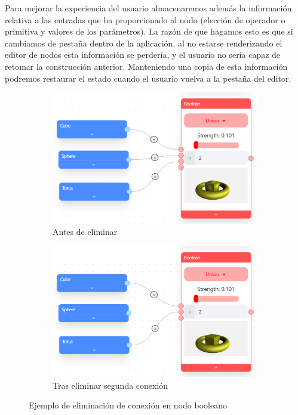 Para mejorar la experiencia del usuario almacenaremos además la información relativa a las entradas que ha proporcionado al nodo (elección de operador o primitiva y valores de los parámetros). La razón de que hagamos esto es que si cambiamos de pestaña dentro de la aplicación, al no estarse renderizando el editor de nodos esta información se perdería, y el usuario no sería capaz de retomar la construcción anterior. Manteniendo una copia de esta información podremos restaurar el estado cuando el usuario vuelva a la pestaña del editor.
\begin{figure}[!h]
    \centering
    \begin{subfigure}[b]{0.45\textwidth}
        \centering
        \includegraphics[width=\textwidth]{Plantilla-TFG-master/img/booleanBorrar1.png}
        \caption{Antes de eliminar}
    \end{subfigure}
    \hspace{15pt}
    \begin{subfigure}[b]{0.45\textwidth}
        \centering
        \includegraphics[width=\textwidth]{Plantilla-TFG-master/img/booleanBorrar2.png}
        \caption{Tras eliminar segunda conexión}
    \end{subfigure}
    \hfill
     \caption{Ejemplo de eliminación de conexión en nodo booleano}
\end{figure}

